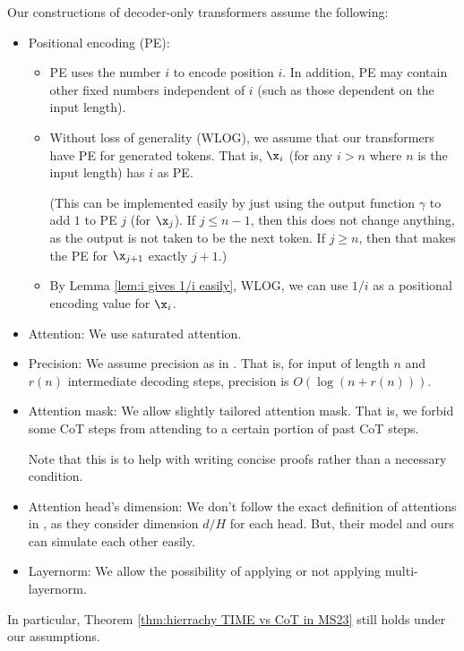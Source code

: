 \begin{remark} \label{rmk:assumptions for our model}
    Our constructions of decoder-only transformers assume the following: 
    \begin{itemize}
        \item Positional encoding (PE):
        \begin{itemize}
            \item PE uses the number $i$ to encode position $i$. In addition, PE may contain other fixed numbers independent of $i$ (such as those dependent on the input length).  
    
            \item Without loss of generality (WLOG), we assume that our transformers have PE for generated tokens. That is, $\x_i$ (for any $i > n$ where $n$ is the input length) has $i$ as PE. 
    
            (This can be implemented easily by just using the output function $\gamma$ to add $1$ to PE $j$ (for $\x_j$). If $j \leq n-1$, then this does not change anything, as the output is not taken to be the next token. If $j \geq n$, then that makes the PE for $\x_{j+1}$ exactly $j+1$.)
    
            \item By Lemma \ref{lem:i gives 1/i easily}, WLOG, we can use $1/i$ as a positional encoding value for $\x_i$. 
        \end{itemize} 
    
        \item Attention: We use saturated attention.
        \item Precision: We assume precision as in \cite{merrill2023expressive}. That is, for input of length $n$ and $r(n)$ intermediate decoding steps, precision is $O(\log(n + r(n)))$.
        \item Attention mask: We allow slightly tailored attention mask. That is, we forbid some CoT steps from attending to a certain portion of past CoT steps. 
        
        Note that this is to help with writing concise proofs rather than a necessary condition.
        \item Attention head's dimension: We don't follow the exact definition of attentions in \cite{merrill2023expressive}, as they consider dimension $d/H$ for each head. But, their model and ours can simulate each other easily. 
        \item Layernorm: We allow the possibility of applying or not applying multi-layernorm. 
    \end{itemize}

    In particular, Theorem \ref{thm:hierrachy TIME vs CoT in MS23} still holds under our assumptions.
\end{remark}

